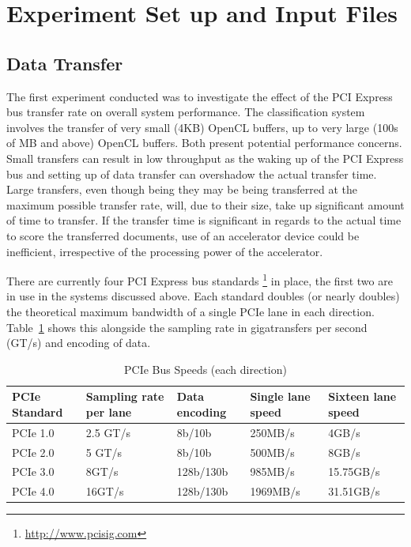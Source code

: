 \section{Experiment Set up and Input Files}

\subsection{Data Transfer}

The first experiment conducted was to investigate the effect of the PCI Express
bus transfer rate on overall system performance. The classification system
involves the transfer of very small (4KB) OpenCL buffers, up to very large (100s
of MB and above) OpenCL buffers. Both present potential performance concerns.
Small transfers can result in low throughput as the waking up of the PCI Express
bus and setting up of data transfer can overshadow the actual transfer time.
Large transfers, even though being they may be being transferred at the maximum
possible transfer rate, will, due to their size, take up significant amount of
time to transfer. If the transfer time is significant in regards to the actual
time to score the transferred documents, use of an accelerator device could be
inefficient, irrespective of the processing power of the accelerator.

There are currently four PCI Express bus standards
\footnote{\url{http://www.pcisig.com}} in place, the first two are in use in the
systems discussed above. Each standard doubles (or nearly doubles) the
theoretical maximum bandwidth of a single PCIe lane in each direction.
Table~\ref{table:pciE} shows this alongside the sampling rate in gigatransfers
per second (GT/s) and encoding of data.

\begin{table}[H]
\begin{tabular}{|l|l|l|l|l|}
\hline
PCIe Standard & Sampling rate per lane & Data encoding & Single lane speed &
Sixteen lane speed\\
\hline
PCIe 1.0 & 2.5 GT/s & 8b/10b & 250MB/s & 4GB/s\\
\hline
PCIe 2.0 & 5 GT/s & 8b/10b & 500MB/s & 8GB/s\\
\hline
PCIe 3.0 & 8GT/s & 128b/130b & 985MB/s & 15.75GB/s\\
\hline
PCIe 4.0 & 16GT/s & 128b/130b & 1969MB/s & 31.51GB/s\\
\hline
\end{tabular}
\caption{PCIe Bus Speeds (each direction)}
\label{table:pciE}
\end{table}

